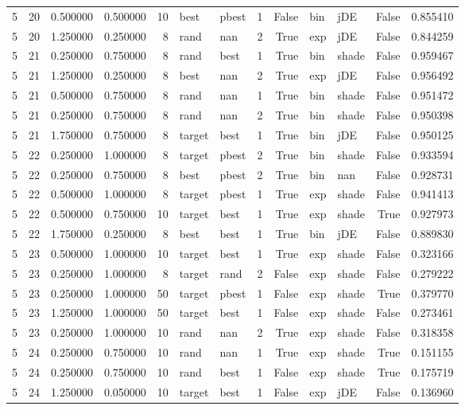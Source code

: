 \begin{tabular}{rrrrrllrrllrr}
5 & 20 & 0.500000 & 0.500000 & 10 & best & pbest & 1 & False & bin & jDE & False & 0.855410 \\
5 & 20 & 1.250000 & 0.250000 & 8 & rand & nan & 2 & True & exp & jDE & False & 0.844259 \\
5 & 21 & 0.250000 & 0.750000 & 8 & rand & best & 1 & True & bin & shade & False & 0.959467 \\
5 & 21 & 1.250000 & 0.250000 & 8 & best & nan & 2 & True & exp & jDE & False & 0.956492 \\
5 & 21 & 0.500000 & 0.750000 & 8 & rand & nan & 1 & True & bin & shade & False & 0.951472 \\
5 & 21 & 0.250000 & 0.750000 & 8 & rand & nan & 2 & True & bin & shade & False & 0.950398 \\
5 & 21 & 1.750000 & 0.750000 & 8 & target & best & 1 & True & bin & jDE & False & 0.950125 \\
5 & 22 & 0.250000 & 1.000000 & 8 & target & pbest & 2 & True & bin & shade & False & 0.933594 \\
5 & 22 & 0.250000 & 0.750000 & 8 & best & pbest & 2 & True & bin & nan & False & 0.928731 \\
5 & 22 & 0.500000 & 1.000000 & 8 & target & pbest & 1 & True & exp & shade & False & 0.941413 \\
5 & 22 & 0.500000 & 0.750000 & 10 & target & best & 1 & True & exp & shade & True & 0.927973 \\
5 & 22 & 1.750000 & 0.250000 & 8 & best & best & 1 & True & bin & jDE & False & 0.889830 \\
5 & 23 & 0.500000 & 1.000000 & 10 & target & best & 1 & True & exp & shade & False & 0.323166 \\
5 & 23 & 0.250000 & 1.000000 & 8 & target & rand & 2 & False & exp & shade & False & 0.279222 \\
5 & 23 & 0.250000 & 1.000000 & 50 & target & pbest & 1 & False & exp & shade & True & 0.379770 \\
5 & 23 & 1.250000 & 1.000000 & 50 & target & best & 1 & False & exp & shade & False & 0.273461 \\
5 & 23 & 0.250000 & 1.000000 & 10 & rand & nan & 2 & True & exp & shade & False & 0.318358 \\
5 & 24 & 0.250000 & 0.750000 & 10 & rand & nan & 1 & True & exp & shade & True & 0.151155 \\
5 & 24 & 0.250000 & 0.750000 & 10 & rand & best & 1 & False & exp & shade & True & 0.175719 \\
5 & 24 & 1.250000 & 0.050000 & 10 & target & best & 1 & False & exp & jDE & False & 0.136960 \\

\end{tabular}

